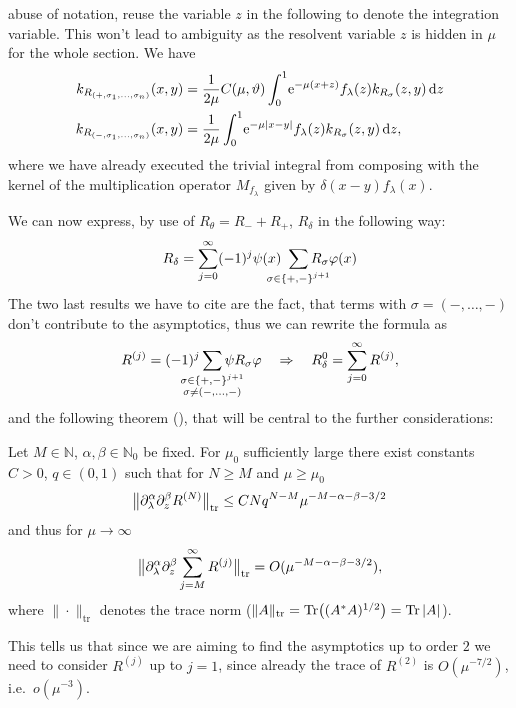 abuse of notation, reuse the variable $z$ in the following to denote the
integration variable.  This won't lead to ambiguity as the resolvent variable
$z$ is hidden in $\mu$ for the whole section. We have
\begin{align}
  \label{eqn:kernel-plus}
  k_{R_{(+,\sigma_1,\ldots,\sigma_n)}}(x,y) &=
  \frac1{2\mu}C(\mu,\theta)\Int{z}{\Eto{-\mu(x+z)}f_\lambda(z)
  k_{R_\sigma}(z,y)} \\
  \label{eqn:kernel-minus}
  k_{R_{(-,\sigma_1,\ldots,\sigma_n)}}(x,y) &=
  \frac1{2\mu}\Int{z}{\Eto{-\mu\Abs{x-y}}f_\lambda(z) k_{R_\sigma}(z,y)},
\end{align}
where we have already executed the trivial integral from composing with the
kernel of the multiplication operator $M_{f_\lambda}$ given by $\delta(x -
y)f_\lambda(x)$.

We can now express, by use of $R_\theta = R_- + R_+$, $R_\delta$ in the
following way:
\begin{align}
  R_\delta = \sum_{j=0}^\infty (-1)^j \psi(x)
  \ \sum_{\mathclap{\sigma\in\{+,-\}^{j+1}}} R_\sigma \phi(x)
\end{align}
The two last results we have to cite are the fact, that terms with $\sigma =
(-,\ldots,-)$ don't contribute to the asymptotics, thus we can rewrite the
formula as
\begin{equation}
  R^{(j)} = (-1)^j \sum_{\mathclap{\substack{ \sigma\in\{+,-\}^{j+1} \\
  \sigma\neq(-,\ldots,-) }}} \psi R_\sigma \phi
  \quad \Rightarrow \quad R^0_\delta =
  \sum_{j=0}^\infty R^{(j)},
\end{equation}
and the following theorem (\cite[Prop.~2.2]{LV13}), that will be central to the
further considerations:
\begin{Theorem}
  \label{thm:r-expansion}
  Let $M\in\mathbb{N}$, $\alpha,\beta\in\mathbb{N}_0$ be fixed. For $\mu_0$
  sufficiently large there exist constants $C>0$, $q\in(0,1)$ such that for
  $N\geq M$ and $\mu \geq \mu_0$
  \begin{equation*}
    \Norm[\mathrm{tr}]{\partial_\lambda^\alpha\partial^\beta_z R^{(N)}}
    \leq CNq^{N-M}\mu^{-M-\alpha-\beta-3/2}
  \end{equation*}
  and thus for $\mu\to\infty$
  \begin{equation*}
    \Norm[\mathrm{tr}]{\partial^\alpha_\lambda\partial^\beta_z\sum_{j=M}^\infty
    R^{(j)}} = O(\mu^{-M-\alpha-\beta-3/2}),
  \end{equation*}
  where $\|\cdot\|_{\mathrm{tr}}$ denotes the trace norm
  ($\|A\|_\mathrm{tr} = \Tr\bigl((A^*A)^{1/2}\bigr) = \Tr\Abs{A}$).
\end{Theorem}
This tells us that since we are aiming to find the asymptotics up to order $2$
we need to consider $R^{(j)}$ up to $j=1$, since already the trace of $R^{(2)}$
is $O(\mu^{-7/2})$, i.e.\ $o(\mu^{-3})$.


